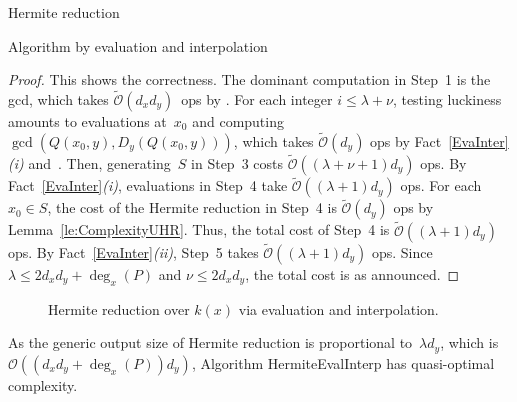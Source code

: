 \documentclass{sig-alt-full}
\newcommand{\bigO}{{\mathcal{O}}}
\newcommand{\bigOsoft}{\tilde{\mathcal{O}}}
\begin{document}
\begin{section}{Hermite reduction}
\begin{subsection}{Algorithm by evaluation and interpolation}
\begin{proof}
This shows the correctness.
The dominant computation in Step~1 is the gcd, which takes
$\bigOsoft(d_xd_y)$~ops by \cite[Cor.~11.9]{MCA2003}.
For each integer $i\le \lambda +
\nu$, testing luckiness amounts to evaluations at~$x_0$ and
computing $\gcd(Q(x_0, y), D_y(Q(x_0, y)))$, which takes
$\bigOsoft(d_y)$ ops by Fact~\ref{EvaInter}\emph{(i)\/}
and~\cite[Cor.~11.6]{MCA2003}. Then,
generating~$S$ in Step~3 costs $\bigOsoft((\lambda + \nu+1)d_y)$ ops.
By Fact~\ref{EvaInter}\emph{(i)}, evaluations in Step~4 take
$\bigOsoft((\lambda + 1)d_y)$ ops. For each $x_0\in S$, the cost of
the Hermite reduction in Step~4 is $\bigOsoft(d_y)$ ops by
Lemma~\ref{le:ComplexityUHR}. Thus, the total cost of Step~4 is
$\bigOsoft((\lambda + 1)d_y)$ ops. By
Fact~\ref{EvaInter}\emph{(ii)}, Step~5
takes $\bigOsoft((\lambda + 1)d_y)$ ops.
Since $\lambda \le 2d_xd_y+
\deg_x(P)$ and $\nu \le 2d_xd_y$,
the total cost is as announced.
\end{proof}
\begin{figure}
\caption{Hermite reduction over $k(x)$ via evaluation and
interpolation.} \label{fig:HREvaInter}
\vskip-10pt
\end{figure}

\end{subsection}

\vspace{-0.14cm}
As the generic output size of Hermite reduction is proportional
to~$\lambda d_y$, which is~$\bigO((d_xd_y+\deg_x(P))d_y)$, Algorithm
\textsf{HermiteEvalInterp} has quasi-optimal complexity.
\end{section}
\end{document}
